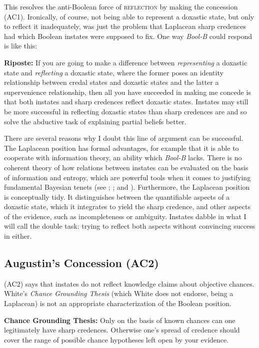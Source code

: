 \documentclass[11pt]{article}
\newcommand{\augustin}[0]{\textit{Bool-B}}
\begin{document}
This resolves the anti-Boolean force of \textsc{reflection} by making
the concession (AC1). Ironically, of course, not being able to
represent a doxastic state, but only to reflect it inadequately, was
just the problem that Laplacean sharp credences had which Boolean
instates were supposed to fix. One way {\augustin} could respond is
like this:

\begin{quotex}
  \textbf{Riposte:} If you are going to make a difference between
  \emph{representing} a doxastic state and \emph{reflecting} a
  doxastic state, where the former poses an identity relationship
  between credal states and doxastic states and the latter a
  supervenience relationship, then all you have succeeded in making me
  concede is that both instates and sharp credences reflect doxastic
  states. Instates may still be more successful in reflecting doxastic
  states than sharp credences are and so solve the abductive task of
  explaining partial beliefs better.
\end{quotex}

There are several reasons why I doubt this line of argument can be
successful. The Laplacean position has formal advantages, for example
that it is able to cooperate with information theory, an ability which
{\augustin} lacks. There is no coherent theory of how relations
between instates can be evaluated on the basis of information and
entropy, which are powerful tools when it comes to justifying
fundamental Bayesian tenets (see ;
; and ). Furthermore, the
Laplacean position is conceptually tidy. It distinguishes between the
quantifiable aspects of a doxastic state, which it integrates to yield
the sharp credence, and other aspects of the evidence, such as
incompleteness or ambiguity. Instates dabble in what I will call the
double task: trying to reflect both aspects without convincing success
in either.

\subsection{Augustin's Concession (AC2)}
\label{jj2}

(AC2) says that instates do not reflect knowledge claims about
objective chances. White's \emph{Chance Grounding Thesis} (which White
does not endorse, being a Laplacean) is not an appropriate
characterization of the Boolean position.

\begin{quotex}
  \textbf{Chance Grounding Thesis:} Only on the basis of known chances
  can one legitimately have sharp credences. Otherwise one's spread of
  credence should cover the range of possible chance hypotheses left
  open by your evidence. 
\end{quotex}
\end{document}
